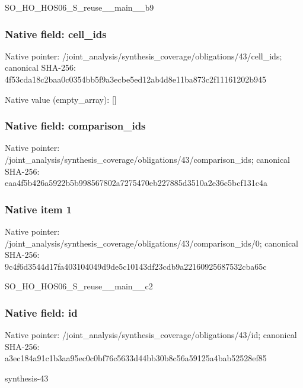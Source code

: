 \documentclass[10pt,a4paper]{article}
\begin{document}
\begingroup\raggedright\sloppy SO\_\allowbreak{}HO\_\allowbreak{}HOS06\_\allowbreak{}S\_\allowbreak{}reuse\_\allowbreak{}\_\allowbreak{}main\_\allowbreak{}\_\allowbreak{}b9\par\endgroup

\subsubsection{Native field: cell\_\allowbreak{}ids}
Native pointer: /joint\_\allowbreak{}analysis/synthesis\_\allowbreak{}coverage/obligations/43/cell\_\allowbreak{}ids; canonical SHA-256: 4f53cda18c2baa0c0354bb5f9a3ecbe5ed12ab4d8e11ba873c2f11161202b945

Native value (empty\_\allowbreak{}array): []

\subsubsection{Native field: comparison\_\allowbreak{}ids}
Native pointer: /joint\_\allowbreak{}analysis/synthesis\_\allowbreak{}coverage/obligations/43/comparison\_\allowbreak{}ids; canonical SHA-256: eaa4f5b426a5922b5b998567802a7275470eb227885d3510a2e36c5bcf131c4a

\subsubsection{Native item 1}
Native pointer: /joint\_\allowbreak{}analysis/synthesis\_\allowbreak{}coverage/obligations/43/comparison\_\allowbreak{}ids/0; canonical SHA-256: 9c4f6d3544d17fa403104049d9de5c10143df23cdb9a22160925687532cba65c

\begingroup\raggedright\sloppy SO\_\allowbreak{}HO\_\allowbreak{}HOS06\_\allowbreak{}S\_\allowbreak{}reuse\_\allowbreak{}\_\allowbreak{}main\_\allowbreak{}\_\allowbreak{}c2\par\endgroup

\subsubsection{Native field: id}
Native pointer: /joint\_\allowbreak{}analysis/synthesis\_\allowbreak{}coverage/obligations/43/id; canonical SHA-256: a3ec184a91c1b3aa95ec0c0bf76c5633d44bb30b8c56a59125a4bab52528ef85

\begingroup\raggedright\sloppy synthesis-43\par\endgroup
\end{document}
